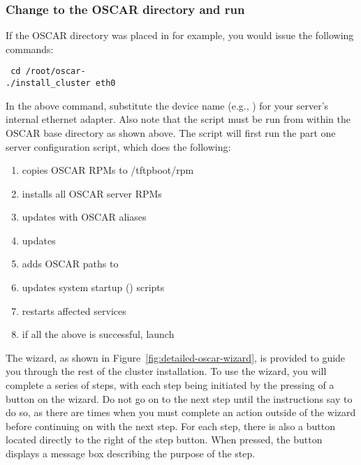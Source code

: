 \subsubsection{Change to the OSCAR directory and run }
\label{det:installcluster}

If the OSCAR directory was placed in  for example, you
would issue the following commands:

\vspace{11pt}
{\tt
  cd /root/oscar-\oscarversion \\
\indent  ./install\_cluster eth0
}
\vspace{11pt}
  
In the above command, substitute the device name (e.g., )
for your server's internal ethernet adapter. Also note that the
 script must be run from within the OSCAR base
directory as shown above. The script will first run the part one
server configuration script, which does the following:

\begin{enumerate}
\item copies OSCAR RPMs to /tftpboot/rpm
\item installs all OSCAR server RPMs
\item updates  with OSCAR aliases
\item updates  
\item adds OSCAR paths to  
\item updates system startup () scripts
\item restarts affected services

\item if all the above is successful, launch 
\end{enumerate}
  
The wizard, as shown in
Figure~\ref{fig:detailed-oscar-wizard}, is provided to guide you
through the rest of the cluster installation.  To use the wizard, you
will complete a series of steps, with each step being initiated by the
pressing of a button on the wizard. Do not go on to the next step
until the instructions say to do so, as there are times when you must
complete an action outside of the wizard before continuing on with the
next step. For each step, there is also a  button located
directly to the right of the step button. When pressed, the
 button displays a message box describing the purpose of
the step.

